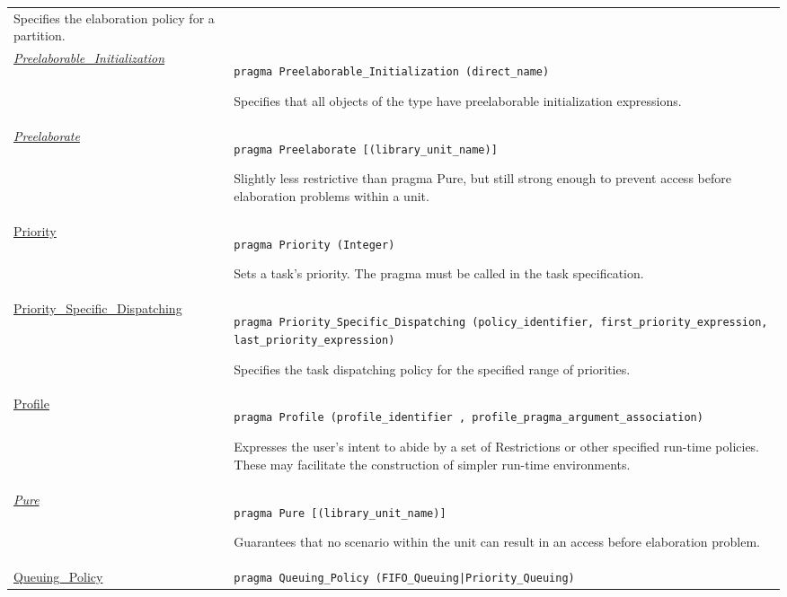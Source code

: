 \documentclass[english]{article}
\begin{document}
\begin{scriptsize}
\begin{multicols*}{3}
\begin{tabular}{@{}p{2cm}p{6.5cm}}
Specifies the elaboration policy for a partition.\\

\href{http://www.ada-auth.org/standards/22rm/html/RM-J-15-14.html}{\textit{Preelaborable\_Initialization}} & \texttt{pragma Preelaborable\_Initialization (direct\_name)}

Specifies that all objects of the type have preelaborable initialization expressions.\\

\href{http://www.ada-auth.org/standards/22rm/html/RM-J-15-14.html}{\textit{Preelaborate}} & \texttt{pragma Preelaborate [(library\_unit\_name)]}

Slightly less restrictive than pragma Pure, but still strong enough to prevent access before elaboration problems within a unit.\\

\href{http://www.ada-auth.org/standards/22rm/html/RM-J-15-11.html}{Priority} & \texttt{pragma Priority (Integer)}

Sets a task's priority. The pragma must be called in the task specification.\\

\href{http://www.ada-auth.org/standards/22rm/html/RM-D-2-2.html}{Priority\_Specific\_Dispatching} & \texttt{pragma Priority\_Specific\_Dispatching (policy\_identifier, first\_priority\_expression, last\_priority\_expression)}

Specifies the task dispatching policy for the specified range of priorities.\\

\href{http://www.ada-auth.org/standards/22rm/html/RM-13-12.html}{Profile} & \texttt{pragma Profile (profile\_identifier {, profile\_pragma\_argument\_association})}

Expresses the user's intent to abide by a set of Restrictions or other specified run-time policies. These may facilitate the construction of simpler run-time environments.\\

\href{http://www.ada-auth.org/standards/22rm/html/RM-J-15-14.html}{\textit{Pure}} & \texttt{pragma Pure [(library\_unit\_name)]}

Guarantees that no scenario within the unit can result in an access before elaboration problem.\\

\href{http://www.ada-auth.org/standards/22rm/html/RM-D-4.html}{Queuing\_Policy} & \texttt{pragma Queuing\_Policy (FIFO\_Queuing|Priority\_Queuing)}


\end{tabular}
\end{multicols*}
\end{scriptsize}
\end{document}
